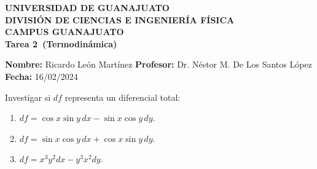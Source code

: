 \documentclass[12pt,a4paper]{article}
\newcommand{\alumno}{Ricardo León Martínez}
\newcommand{\materia}{Termodinámica}
\newcommand{\tarea}{Tarea 2}
\newcommand{\fecha}{16/02/2024}
\begin{document}
    \begin{center}
    {\large\textbf{UNIVERSIDAD DE GUANAJUATO}}\\[0.3cm]
    {\normalsize\textbf{DIVISIÓN DE CIENCIAS E INGENIERÍA FÍSICA}}\\
    {\normalsize\textbf{CAMPUS GUANAJUATO}}\\[1cm]

    {\Large\textbf{\tarea\ (\materia)}}\\[1cm]
    \end{center}

    \textbf{Nombre:} \alumno \hfill
    \textbf{Profesor:} Dr. Néstor M. De Los Santos López \hfill
    \textbf{Fecha:} \fecha \\[0.3cm]

    \begin{problema}
        Investigar si $df$ representa un diferencial total:
        \begin{enumerate}
            \item[(1)] $df=\cos x\sin y\,dx-\sin x\cos y\,dy$.
            \item[(2)] $df=\sin x\cos y\,dx+\cos x\sin y\,dy$.
            \item[(3)] $df=x^{3}y^{2}dx-y^{3}x^{2}dy$.
        \end{enumerate}
    \end{problema}
\end{document}
